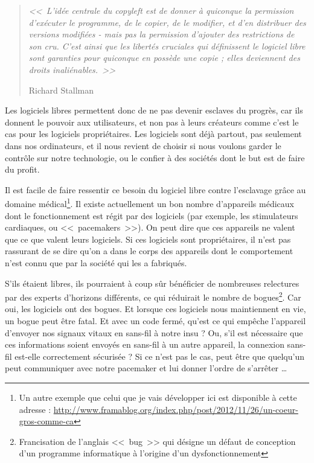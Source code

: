 \begin{quotation}
\textit{<<~L'idée centrale du copyleft est de donner à quiconque la permission d'exécuter le programme, de le copier, de le modifier, et d'en distribuer des versions modifiées - mais pas la permission d'ajouter des restrictions de son cru. C'est ainsi que les libertés cruciales qui définissent le logiciel libre sont garanties pour quiconque en possède une copie ; elles deviennent des droits inaliénables.~>>}
\begin{flushright}Richard Stallman\end{flushright}
\end{quotation}

Les logiciels libres permettent donc de ne pas devenir esclaves du progrès, car ils donnent le pouvoir aux utilisateurs, et non pas à leurs créateurs comme c'est le cas pour les logiciels propriétaires.
Les logiciels sont déjà partout, pas seulement dans nos ordinateurs, et il nous revient de choisir si nous voulons garder le contrôle sur notre technologie, ou le confier à des sociétés dont le but est de faire du profit.

Il est facile de faire ressentir ce besoin du logiciel libre contre l'esclavage grâce au domaine médical\footnote{Un autre exemple que celui que je vais développer ici est disponible à cette adresse : \url{http://www.framablog.org/index.php/post/2012/11/26/un-coeur-gros-comme-ca}}.
Il existe actuellement un bon nombre d'appareils médicaux dont le fonctionnement est régit par des logiciels (par exemple, les stimulateurs cardiaques, ou <<~pacemakers~>>).
On peut dire que ces appareils ne valent que ce que valent leurs logiciels.
Si ces logiciels sont propriétaires, il n'est pas rassurant de se dire qu'on a dans le corps des appareils dont le comportement n'est connu que par la société qui les a fabriqués.

S'ils étaient libres, ils pourraient à coup sûr bénéficier de nombreuses relectures par des experts d'horizons différents, ce qui réduirait le nombre de bogues\footnote{Francisation de l'anglais <<~bug~>> qui désigne un défaut de conception d'un programme informatique à l'origine d'un dysfonctionnement}.
Car oui, les logiciels ont des bogues.
Et lorsque ces logiciels nous maintiennent en vie, un bogue peut être fatal.
Et avec un code fermé, qu'est ce qui empêche l'appareil d'envoyer nos signaux vitaux en sans-fil à notre insu ?
Ou, s'il est nécessaire que ces informations soient envoyés en sans-fil à un autre appareil, la connexion sans-fil est-elle correctement sécurisée ?
Si ce n'est pas le cas, peut être que quelqu'un peut communiquer avec notre pacemaker et lui donner l'ordre de s'arrêter \dots{}

